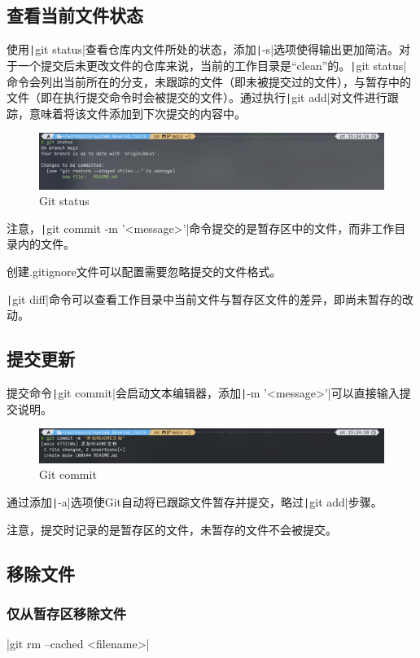 \documentclass[fontset=ubuntu]{ctexart}
\begin{document}
\subsection{查看当前文件状态}
使用\texttt|git status|查看仓库内文件所处的状态，添加\texttt|-s|选项使得输出更加简洁。对于一个提交后未更改文件的仓库来说，当前的工作目录是“clean”的。\texttt|git status|命令会列出当前所在的分支，未跟踪的文件（即未被提交过的文件），与暂存中的文件（即在执行提交命令时会被提交的文件）。通过执行\texttt|git add|对文件进行跟踪，意味着将该文件添加到下次提交的内容中。
\begin{figure}[htb]
    \centering
    \includegraphics[width=0.5\linewidth]{Git status.png}
    \caption{Git status}
    \label{fig:Git status}
\end{figure}

注意，\texttt|git commit -m '<message>'|命令提交的是暂存区中的文件，而非工作目录内的文件。

创建.gitignore文件可以配置需要忽略提交的文件格式。

\texttt|git diff|命令可以查看工作目录中当前文件与暂存区文件的差异，即尚未暂存的改动。

\subsection{提交更新}
提交命令\texttt|git commit|会启动文本编辑器，添加\texttt|-m '<message>'|可以直接输入提交说明。
\begin{figure}[htb]
    \centering
    \includegraphics[width=0.5\linewidth]{Git commit.png}
    \caption{Git commit}
    \label{fig:Git commit}
\end{figure}

通过添加\texttt|-a|选项使Git自动将已跟踪文件暂存并提交，略过\texttt|git add|步骤。

注意，提交时记录的是暂存区的文件，未暂存的文件不会被提交。

\subsection{移除文件}
\subsubsection{仅从暂存区移除文件}
|git rm --cached <filename>|
\end{document}
